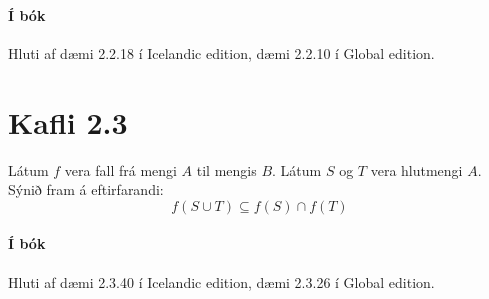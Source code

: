 \documentclass{article}
\begin{document}
\paragraph{Í bók} Hluti af dæmi 2.2.18 í Icelandic edition, dæmi 2.2.10 í Global edition.

\section{Kafli 2.3}

\question
Látum $f$ vera fall frá mengi $A$ til mengis $B$. Látum $S$ og $T$ vera hlutmengi $A$. Sýnið fram á eftirfarandi: \[f(S \cup T) \subseteq f(S) \cap f(T)\]

\paragraph{Í bók} Hluti af dæmi 2.3.40 í Icelandic edition, dæmi 2.3.26 í Global edition.
\end{document}
